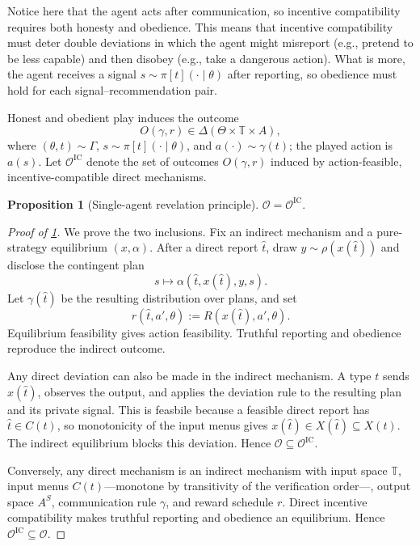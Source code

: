 \documentclass[12pt,reqno]{article}
\theoremstyle{definition} \newtheorem{example}{Example}
\theoremstyle{definition} \newtheorem{condition}{Condition}
\theoremstyle{definition} \newtheorem{corollary}{Corollary}
\theoremstyle{definition} \newtheorem{claim}{Claim}
\theoremstyle{definition} \newtheorem{definition}{Definition}
\theoremstyle{definition} \newtheorem{conjecture}{Conjecture}
\theoremstyle{definition} \newtheorem{Lemma}{Lemma}
\theoremstyle{definition} \newtheorem{lemma}{Lemma}
\theoremstyle{plain} \newtheorem{theorem}{Theorem}
\theoremstyle{definition} \newtheorem{assumption}{Assumption}
\theoremstyle{definition} \newtheorem*{assumptionnonumber}{Assumption}
\theoremstyle{definition} \newtheorem*{theoremNoNumber}{Proposition}
\theoremstyle{definition}\newtheorem{proposition}{Proposition}
\theoremstyle{definition} \newtheorem{observation}{Observation}
\theoremstyle{definition} \newtheorem*{definitionNoNumber}{Definition}
\theoremstyle{definition} \newtheorem{Definition}{Definition}
\theoremstyle{definition} \newtheorem*{DefinitionNoNumber}{Definition}
\theoremstyle{definition} \newtheorem*{fact}{Fact}
\theoremstyle{definition} \newtheorem*{property}{Property}
\theoremstyle{definition} \newtheorem{remark}{Remark}
\theoremstyle{definition}\newtheorem{romanexampleinner}{Example}
\begin{document}
Notice here that the agent acts after communication, so incentive compatibility requires both honesty and obedience. This means that incentive compatibility must deter double deviations in which the agent might misreport (e.g., pretend to be less capable) and then disobey (e.g., take a dangerous action). What is more, the agent receives a signal $s\sim\pi[t](\cdot\mid\theta)$ after reporting, so obedience must hold for each signal--recommendation pair. 

Honest and obedient play induces the outcome
\[
O(\gamma,r)
\in
\Delta(\Theta\times\mathbb T\times A),
\]
where \((\theta,t)\sim\Gamma\), \(s\sim\pi[t](\cdot\mid\theta)\), and \(a(\cdot)\sim\gamma(t)\); the played action is \(a(s)\). Let \(\mathcal O^{\mathrm{IC}}\) denote the set of outcomes \(O(\gamma,r)\) induced by action-feasible, incentive-compatible direct mechanisms.

\begin{proposition}[Single-agent revelation principle]\label{prop:single-revelation}
\(\mathcal O=\mathcal O^{\mathrm{IC}}\).
\end{proposition}

\begin{proof}[Proof of \cref{prop:single-revelation}]
We prove the two inclusions. Fix an indirect mechanism and a pure-strategy equilibrium \((x,\alpha)\). After a direct report \(\hat t\), draw \(y\sim\rho(x(\hat t))\) and disclose the contingent plan
\[
s\longmapsto\alpha(\hat t,x(\hat t),y,s).
\]
Let \(\gamma(\hat t)\) be the resulting distribution over plans, and set
\[
r(\hat t,a',\theta):=R(x(\hat t),a',\theta).
\]
Equilibrium feasibility gives action feasibility. Truthful reporting and obedience reproduce the indirect outcome.

Any direct deviation can also be made in the indirect mechanism. A type \(t\) sends \(x(\hat t)\), observes the output, and applies the deviation rule to the resulting plan and its private signal. This is feasbile because a feasible direct report has \(\hat t\in C(t)\), so monotonicity of the input menus gives \(x(\hat t)\in X(\hat t)\subseteq X(t)\). The indirect equilibrium blocks this deviation. Hence \(\mathcal O\subseteq\mathcal O^{\mathrm{IC}}\).

Conversely, any direct mechanism is an indirect mechanism with input space \(\mathbb T\), input menus \(C(t)\)---monotone by transitivity of the verification order---, output space \(A^S\), communication rule \(\gamma\), and reward schedule \(r\). Direct incentive compatibility makes truthful reporting and obedience an equilibrium. Hence \(\mathcal O^{\mathrm{IC}}\subseteq\mathcal O\).
\end{proof}
\end{document}
